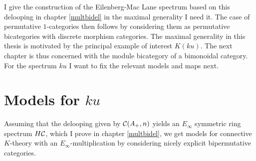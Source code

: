 I give the construction of the Eilenberg-Mac Lane spectrum based on
this delooping in chapter \ref{multbidel} in the maximal generality
I need it. The case of permutative $1$-categories then follows by 
considering them as permutative bicategories with discrete morphism
categories. The maximal generality in this thesis is motivated by the 
principal example of interest $K(ku)$. The next chapter is thus 
concerned with the module bicategory of a bimonoidal category. 
For the spectrum $ku$ I want to fix the relevant models and maps next.

\section{Models for $ku$}\label{kumodels}
Assuming that the delooping given by $\mathcal{C}(A_+,n)$ yields an $E_\infty$ 
symmetric ring spectrum $H\mathcal{C}$, which I prove in chapter \ref{multbidel}, 
we get models for connective $K$-theory with an $E_\infty$-multiplication 
by considering nicely explicit bipermutative categories.


